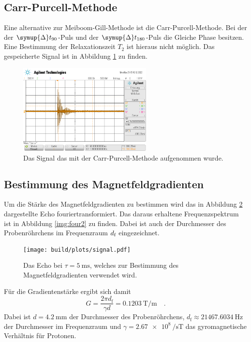 \subsection{Carr-Purcell-Methode}


\noindent
Eine alternative zur Meiboom-Gill-Methode ist die Carr-Purcell-Methode. Bei der der $\symup{\Delta} t_{90}$-Puls und der $\symup{\Delta} t_{180}$-Puls die Gleiche Phase besitzen.
Eine Bestimmung der Relaxationszeit $T_2$ ist hieraus nicht möglich. Das gespeicherte Signal ist in Abbildung \ref{img:Sig2} zu finden.
\begin{figure}[H]
  \centering
  \includegraphics[width=0.6\textwidth]{python/data/scope_3.png}
  \caption{Das Signal das mit der Carr-Purcell-Methode aufgenommen wurde.}
\label{img:Sig2}
\end{figure}

\subsection{Bestimmung des Magnetfeldgradienten}


\noindent
Um die Stärke des Magnetfeldgradienten zu bestimmen wird das in Abbildung \ref{img:four1} dargestellte Echo fouriertransformiert. 
Das daraus erhaltene Frequenzspektrum ist in Abbildung \ref{img:four2} zu finden.
Dabei ist auch der Durchmesser des Probenröhrchens im Frequenzraum $d_{\text{f}}$ eingezeichnet.

\begin{figure}[H]
  \centering
  \texttt{[image: build/plots/signal.pdf]}
  \caption{Das Echo bei $\tau = \SI{5}{\milli\second}$, welches zur Bestimmung des Magnetfeldgradienten verwendet wird.}
\label{img:four1}
\end{figure}

\noindent
Für die Gradientenstärke ergibt sich damit
\begin{equation*}
  G = \frac{2\pi d_\text{f}}{\gamma d} = \SI{0.1203}{\tesla\per\metre} \quad.
\end{equation*}
Dabei ist  $d = \SI{4.2}{\milli\metre}$ \cite{V49} der Durchmesser des Probenröhrchens, $d_\text{f} \approx \SI{21467.6034}{\hertz}$ der Durchmesser im Frequenzraum und
$\gamma = \SI{2.67e8}{\per\second\tesla}$ \cite{gyro} das gyromagnetische Verhältnis für Protonen.

